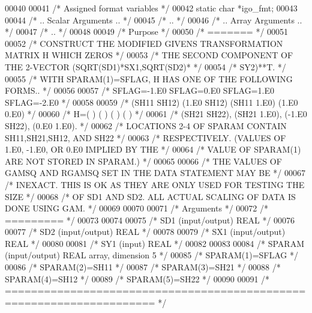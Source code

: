 \begin{DoxyCode}
00040 
00041     \textcolor{comment}{/* Assigned format variables */}
00042     \textcolor{keyword}{static} \textcolor{keywordtype}{char} *igo\_fmt;
00043 
00044 \textcolor{comment}{/*     .. Scalar Arguments .. */}
00045 \textcolor{comment}{/*     .. */}
00046 \textcolor{comment}{/*     .. Array Arguments .. */}
00047 \textcolor{comment}{/*     .. */}
00048 
00049 \textcolor{comment}{/*  Purpose */}
00050 \textcolor{comment}{/*  ======= */}
00051 
00052 \textcolor{comment}{/*     CONSTRUCT THE MODIFIED GIVENS TRANSFORMATION MATRIX H WHICH ZEROS */}
00053 \textcolor{comment}{/*     THE SECOND COMPONENT OF THE 2-VECTOR  (SQRT(SD1)*SX1,SQRT(SD2)* */}
00054 \textcolor{comment}{/*     SY2)**T. */}
00055 \textcolor{comment}{/*     WITH SPARAM(1)=SFLAG, H HAS ONE OF THE FOLLOWING FORMS.. */}
00056 
00057 \textcolor{comment}{/*     SFLAG=-1.E0     SFLAG=0.E0        SFLAG=1.E0     SFLAG=-2.E0 */}
00058 
00059 \textcolor{comment}{/*       (SH11  SH12)    (1.E0  SH12)    (SH11  1.E0)    (1.E0  0.E0) */}
00060 \textcolor{comment}{/*     H=(          )    (          )    (          )    (          ) */}
00061 \textcolor{comment}{/*       (SH21  SH22),   (SH21  1.E0),   (-1.E0 SH22),   (0.E0  1.E0). */}
00062 \textcolor{comment}{/*     LOCATIONS 2-4 OF SPARAM CONTAIN SH11,SH21,SH12, AND SH22 */}
00063 \textcolor{comment}{/*     RESPECTIVELY. (VALUES OF 1.E0, -1.E0, OR 0.E0 IMPLIED BY THE */}
00064 \textcolor{comment}{/*     VALUE OF SPARAM(1) ARE NOT STORED IN SPARAM.) */}
00065 
00066 \textcolor{comment}{/*     THE VALUES OF GAMSQ AND RGAMSQ SET IN THE DATA STATEMENT MAY BE */}
00067 \textcolor{comment}{/*     INEXACT.  THIS IS OK AS THEY ARE ONLY USED FOR TESTING THE SIZE */}
00068 \textcolor{comment}{/*     OF SD1 AND SD2.  ALL ACTUAL SCALING OF DATA IS DONE USING GAM. */}
00069 
00070 
00071 \textcolor{comment}{/*  Arguments */}
00072 \textcolor{comment}{/*  ========= */}
00073 
00074 
00075 \textcolor{comment}{/*  SD1    (input/output) REAL */}
00076 
00077 \textcolor{comment}{/*  SD2    (input/output) REAL */}
00078 
00079 \textcolor{comment}{/*  SX1    (input/output) REAL */}
00080 
00081 \textcolor{comment}{/*  SY1    (input) REAL */}
00082 
00083 
00084 \textcolor{comment}{/*  SPARAM (input/output)  REAL array, dimension 5 */}
00085 \textcolor{comment}{/*     SPARAM(1)=SFLAG */}
00086 \textcolor{comment}{/*     SPARAM(2)=SH11 */}
00087 \textcolor{comment}{/*     SPARAM(3)=SH21 */}
00088 \textcolor{comment}{/*     SPARAM(4)=SH12 */}
00089 \textcolor{comment}{/*     SPARAM(5)=SH22 */}
00090 
00091 \textcolor{comment}{/*  ===================================================================== */}

\end{DoxyCode}
